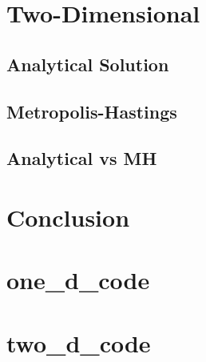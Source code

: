 \documentclass[a4paper,11pt,twoside]{article}
\begin{document}
\section{Two-Dimensional}
\subsection{Analytical Solution}
\subsection{Metropolis-Hastings}
\subsection{Analytical vs MH}

\section{Conclusion}

\appendix
\section{one_d_code}
\section{two_d_code}

\begin{thebibliography}{10}

	\bibitem{} 

	\bibitem{}
\end{thebibliography}
\end{document}
